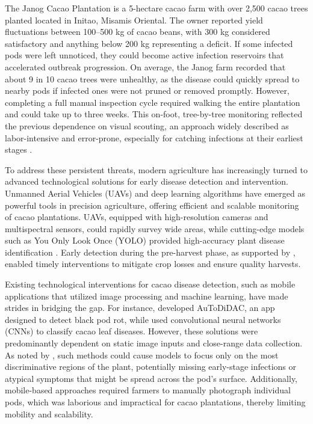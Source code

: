 {	The Janog Cacao Plantation is a 5-hectare cacao farm with over 2,500 cacao trees planted located in Initao, Misamis Oriental. The owner reported yield fluctuations between 100–500 kg of cacao beans, with 300 kg considered satisfactory and anything below 200 kg representing a deficit. If some infected pods were left unnoticed, they could become active infection reservoirs that accelerated outbreak progression. On average, the Janog farm recorded that about 9 in 10 cacao trees were unhealthy, as the disease could quickly spread to nearby pods if infected ones were not pruned or removed promptly. However, completing a full manual inspection cycle required walking the entire plantation and could take up to three weeks. This on-foot, tree-by-tree monitoring reflected the previous dependence on visual scouting, an approach widely described as labor-intensive and error-prone, especially for catching infections at their earliest stages \citep{PhilCacaoRoadmap2021}.
	
	To address these persistent threats, modern agriculture has increasingly turned to advanced technological solutions for early disease detection and intervention. Unmanned Aerial Vehicles (UAVs) and deep learning algorithms have emerged as powerful tools in precision agriculture, offering efficient and scalable monitoring of cacao plantations. UAVs, equipped with high-resolution cameras and multispectral sensors, could rapidly survey wide areas, while cutting-edge models such as You Only Look Once (YOLO) provided high-accuracy plant disease identification \citep{Vyas2023}. Early detection during the pre-harvest phase, as supported by \cite{Upadhyay2025,Yadav2024}, enabled timely interventions to mitigate crop losses and ensure quality harvests.
	
	Existing technological interventions for cacao disease detection, such as mobile applications that utilized image processing and machine learning, have made strides in bridging the gap. For instance, \cite{Tan2018} developed AuToDiDAC, an app designed to detect black pod rot, while \cite{Tovurawa2025} used convolutional neural networks (CNNs) to classify cacao leaf diseases. However, these solutions were predominantly dependent on static image inputs and close-range data collection. As noted by \cite{Taesiri2023}, such methods could cause models to focus only on the most discriminative regions of the plant, potentially missing early-stage infections or atypical symptoms that might be spread across the pod’s surface. Additionally, mobile-based approaches required farmers to manually photograph individual pods, which was laborious and impractical for cacao plantations, thereby limiting mobility and scalability.
	
}
